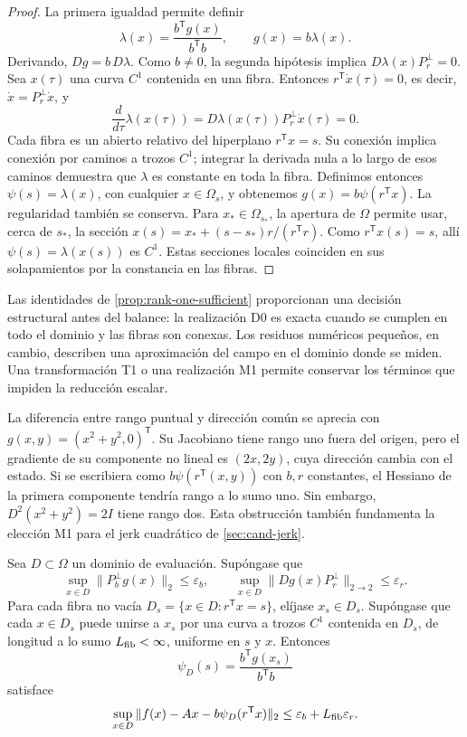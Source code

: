 \begin{proof}
La primera igualdad permite definir
\[
 \lambda(x)=\frac{b^{\mathsf T}g(x)}{b^{\mathsf T}b},
 \qquad g(x)=b\lambda(x).
\]
Derivando, \(Dg=b\,D\lambda\). Como \(b\neq0\), la segunda hipótesis implica
\(D\lambda(x)P_r^\perp=0\). Sea \(x(\tau)\) una curva \(C^1\) contenida en una
fibra. Entonces \(r^{\mathsf T}\dot x(\tau)=0\), es decir,
\(\dot x=P_r^\perp\dot x\), y
\[
 \frac{d}{d\tau}\lambda(x(\tau))
 =D\lambda(x(\tau))P_r^\perp\dot x(\tau)=0.
\]
Cada fibra es un abierto relativo del hiperplano \(r^{\mathsf T}x=s\).
Su conexión implica conexión por caminos a trozos \(C^1\); integrar la
derivada nula a lo largo de esos caminos demuestra que \(\lambda\) es
constante en toda la fibra. Definimos entonces
\(\psi(s)=\lambda(x)\), con cualquier \(x\in\Omega_s\), y obtenemos
\(g(x)=b\psi(r^{\mathsf T}x)\).
La regularidad también se conserva. Para \(x_*\in\Omega_{s_*}\), la apertura
de \(\Omega\) permite usar, cerca de \(s_*\), la sección
\(x(s)=x_*+(s-s_*)r/(r^{\mathsf T}r)\). Como
\(r^{\mathsf T}x(s)=s\), allí \(\psi(s)=\lambda(x(s))\) es \(C^1\).
Estas secciones locales coinciden en sus solapamientos por la constancia en
las fibras.
\end{proof}

Las identidades de \cref{prop:rank-one-sufficient} proporcionan una
decisión estructural antes del balance: la realización D0 es exacta cuando
se cumplen en todo el dominio y las fibras son conexas. Los residuos
numéricos pequeños, en cambio, describen una aproximación del campo en el
dominio donde se miden. Una transformación T1 o una realización M1 permite
conservar los términos que impiden la reducción escalar.

La diferencia entre rango puntual y dirección común se aprecia con
\(g(x,y)=(x^2+y^2,0)^{\mathsf T}\). Su Jacobiano tiene rango uno fuera
del origen, pero el gradiente de su componente no lineal es \((2x,2y)\),
cuya dirección cambia con el estado. Si se escribiera como
\(b\psi(r^{\mathsf T}(x,y))\) con \(b,r\) constantes, el Hessiano de la
primera componente tendría rango a lo sumo uno. Sin embargo,
\(D^2(x^2+y^2)=2I\) tiene rango dos. Esta obstrucción también fundamenta
la elección M1 para el jerk cuadrático de \cref{sec:cand-jerk}.

\begin{proposition}
\label{prop:rank-one-approximation-bound}
Sea \(D\subset\Omega\) un dominio de evaluación. Supóngase que
\[
 \sup_{x\in D}\|P_b^\perp g(x)\|_2\le\varepsilon_b,
 \qquad
 \sup_{x\in D}\|Dg(x)P_r^\perp\|_{2\to2}\le\varepsilon_r.
\]
Para cada fibra no vacía \(D_s=\{x\in D:r^{\mathsf T}x=s\}\), elíjase
\(x_s\in D_s\). Supóngase que cada \(x\in D_s\) puede unirse a \(x_s\)
por una curva a trozos \(C^1\) contenida en \(D_s\), de longitud a lo sumo
\(L_{\rm fib}<\infty\), uniforme en \(s\) y \(x\). Entonces
\[
 \psi_D(s)=\frac{b^{\mathsf T}g(x_s)}{b^{\mathsf T}b}
\]
satisface
\[
 \sup_{x\in D}\|f(x)-Ax-b\psi_D(r^{\mathsf T}x)\|_2
 \le\varepsilon_b+L_{\rm fib}\varepsilon_r.
\]
\end{proposition}

